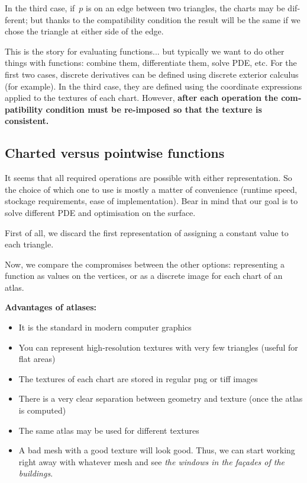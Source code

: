 \documentclass{article}
\begin{document}
\begin{otherlanguage}{british}
In the third case, if~$p$ is on an edge between two triangles, the charts may
be different; but thanks to the compatibility condition the result will be
the same if we chose the triangle at either side of the edge.


This is the story for evaluating functions... but typically we want to do
other things with functions: combine them, differentiate them, solve PDE,
etc.  For the first two cases, discrete derivatives can be defined using
discrete exterior calculus (for example).  In the third case, they are
defined using the coordinate expressions applied to the textures of each
chart.  However, {\bf after each operation the compatibility condition must be
re-imposed so that the texture is consistent.}

\subsection{Charted versus pointwise functions}

It seems that all required operations are possible with either
representation.  So the choice of which one to use is mostly a matter of
convenience (runtime speed, stockage requirements, ease of implementation).
Bear in mind that our goal is to solve different PDE and optimisation on the
surface.

First of all, we discard the first representation of assigning a constant
value to each triangle.

Now, we compare the compromises between the other options: representing a
function as values on the vertices, or as a discrete image for each chart of
an atlas.

{\bf Advantages of atlases:}

\begin{itemize}
	\item It is the standard in modern computer graphics
	\item You can represent high-resolution textures with very few
		triangles (useful for flat areas)
	\item The textures of each chart are stored in regular png or tiff
		images
	\item There is a very clear separation between geometry and texture
		(once the atlas is computed)
	\item The same atlas may be used for different textures
	\item A bad mesh with a good texture will look good.  Thus, we can
		start working right away with whatever mesh and see \emph{the
		windows in the façades of the buildings}.
\end{itemize}


\end{otherlanguage}
\end{document}
